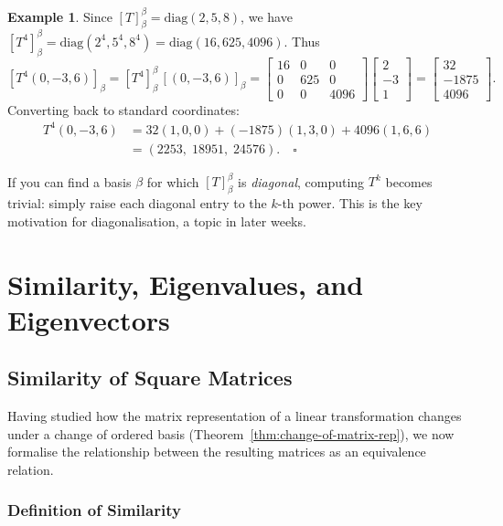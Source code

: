 \documentclass[11pt, a4paper, notitlepage]{report}
\theoremstyle{definition}
\newtheorem{example}[theorem]{Example}
\theoremstyle{remark}
\begin{document}
\begin{example}
Since $[T]_\beta^\beta = \mathrm{diag}(2,5,8)$, we have $[T^4]_\beta^\beta = \mathrm{diag}(2^4, 5^4, 8^4) = \mathrm{diag}(16, 625, 4096)$.  Thus
\[
  [T^4(0,-3,6)]_\beta
  = [T^4]_\beta^\beta\,[(0,-3,6)]_\beta
  = \begin{bmatrix}16&0&0\\0&625&0\\0&0&4096\end{bmatrix}\begin{bmatrix}2\\-3\\1\end{bmatrix}
  = \begin{bmatrix}32\\-1875\\4096\end{bmatrix}.
\]
Converting back to standard coordinates:
\begin{align*}
  T^4(0,-3,6)
  &= 32(1,0,0) + (-1875)(1,3,0) + 4096(1,6,6) \\
  &= (2253,\;18951,\;24576). \quad\square
\end{align*}
\end{example}

\begin{examtip}[title={Exam Tip: Diagonal Matrix Powers}]
If you can find a basis $\beta$ for which $[T]_\beta^\beta$ is \emph{diagonal}, computing
$T^k$ becomes trivial: simply raise each diagonal entry to the $k$-th power.  This is the
key motivation for diagonalisation, a topic in later weeks.
\end{examtip}

\chapter{Similarity, Eigenvalues, and Eigenvectors}
\label{chap:week8}

\section{Similarity of Square Matrices}
\label{sec:similarity}

Having studied how the matrix representation of a linear transformation changes under a change
of ordered basis (Theorem~\ref{thm:change-of-matrix-rep}), we now formalise the relationship
between the resulting matrices as an equivalence relation.

\subsection{Definition of Similarity}
\end{document}
